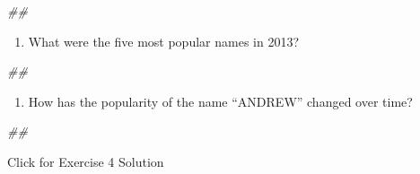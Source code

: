 \documentclass[
]{book}
\newenvironment{Shaded}{\begin{snugshade}}{\end{snugshade}}
\newcommand{\CommentTok}[1]{\textcolor[rgb]{0.56,0.35,0.01}{\textit{#1}}}
\providecommand{\tightlist}{%
  \setlength{\itemsep}{0pt}\setlength{\parskip}{0pt}}
\begin{document}
\begin{Shaded}
\begin{Highlighting}[]
\CommentTok{\#\# }
\end{Highlighting}
\end{Shaded}

\begin{enumerate}
\def\labelenumi{\arabic{enumi}.}
\setcounter{enumi}{2}
\tightlist
\item
  What were the five most popular names in 2013?
\end{enumerate}

\begin{Shaded}
\begin{Highlighting}[]
\CommentTok{\#\# }
\end{Highlighting}
\end{Shaded}

\begin{enumerate}
\def\labelenumi{\arabic{enumi}.}
\setcounter{enumi}{3}
\tightlist
\item
  How has the popularity of the name ``ANDREW'' changed over time?
\end{enumerate}

\begin{Shaded}
\begin{Highlighting}[]
\CommentTok{\#\# }
\end{Highlighting}
\end{Shaded}

{Click for Exercise 4 Solution}
\end{document}
